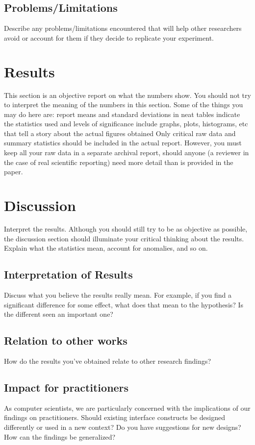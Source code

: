 \subsection{Problems/Limitations}
Describe any problems/limitations encountered that will help other researchers avoid or account for them if they decide to replicate your experiment.
\section{Results}

This section is an objective report on what the numbers show. You should not try to interpret the meaning of the numbers in this section. Some of the things you may do here are: 
report means and standard deviations in neat tables 
indicate the statistics used and levels of significance 
include graphs, plots, histograms, etc that tell a story about the actual figures obtained 
Only critical raw data and summary statistics should be included in the actual report. However, you must keep all your raw data in a separate archival report, should anyone (a reviewer in the case of real scientific reporting) need more detail than is provided in the paper. 
\section{Discussion}
Interpret the results. Although you should still try to be as objective as possible, the discussion section should illuminate your critical thinking about the results. Explain what the statistics mean, account for anomalies, and so on.
\subsection{Interpretation of Results}
Discuss what you believe the results really mean. For example, if you find a significant difference for some effect, what does that mean to the hypothesis? Is the different seen an important one?
\subsection{Relation to other works}
How do the results you’ve obtained relate to other research findings?
\subsection{Impact for practitioners}
As computer scientists, we are particularly concerned with the implications of our findings on practitioners. Should existing interface constructs be designed differently or used in a new context? Do you have suggestions for new designs? How can the findings be generalized?
